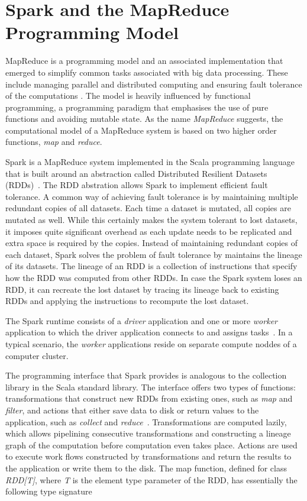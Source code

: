 \section{Spark and the MapReduce Programming Model}

MapReduce is a programming model and an associated implementation that emerged to simplify common tasks associated with big data processing. These include managing parallel and distributed computing and ensuring fault tolerance of the computations \cite{Dean:2008:MSD:1327452.1327492}. The model is heavily influenced by functional programming, a programming paradigm that emphasises the use of pure functions and avoiding mutable state. As the name \textit{MapReduce} suggests, the computational model of a MapReduce system is based on two higher order functions, \textit{map} and \textit{reduce}. 

Spark is a MapReduce system implemented in the Scala programming language that is built around an abstraction called Distributed Resilient Datasets (RDDs)~\cite{Zaharia:2012:RDD:2228298.2228301}. The RDD abstration allows Spark to implement efficient fault tolerance. A common way of achieving fault tolerance is by maintaining multiple redundant copies of all datasets. Each time a dataset is mutated, all copies are mutated as well. While this certainly makes the system tolerant to lost datasets, it imposes quite significant overhead as each update needs to be replicated and extra space is required by the copies. Instead of maintaining redundant copies of each dataset, Spark solves the problem of fault tolerance by maintains the lineage of its datasets. The lineage of an RDD is a collection of instructions that specify how the RDD was computed from other RDDs. In case the Spark system loses an RDD, it can recreate the lost dataset by tracing its lineage back to existing RDDs and applying the instructions to recompute the lost dataset.       

The Spark runtime consists of a \textit{driver} application and one or more \textit{worker} application to which the driver application connects to and assigns tasks~\cite{Zaharia:2012:RDD:2228298.2228301}. In a typical scenario, the \textit{worker} applications reside on separate compute noddes of a computer cluster.

The programming interface that Spark provides is analogous to the collection library in the Scala standard library. The interface offers two types of functions: transformations that construct new RDDs from existing ones, such as \textit{map} and \textit{filter}, and actions that either save data to disk or return values to the application, such as \textit{collect} and \textit{reduce}~\cite{Zaharia:2012:RDD:2228298.2228301}. Transformations are computed lazily, which allows pipelining consecutive transformations and constructing a lineage graph of the computation before computation even takes place. Actions are used to execute work flows constructed by transformations and return the results to the application or write them to the disk. The map function, defined for class \textit{RDD[T]}, where \textit{T} is the element type parameter of the RDD, has essentially the following type signature

